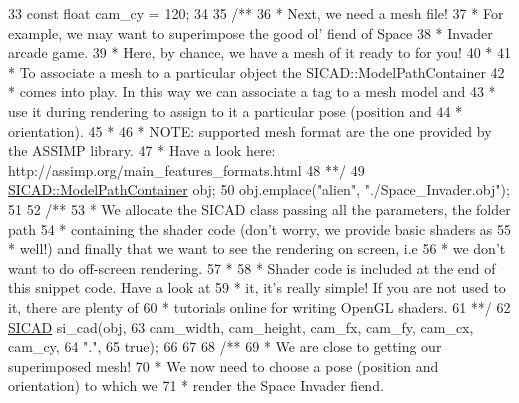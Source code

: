 \begin{DoxyCodeInclude}
33     \textcolor{keyword}{const} \textcolor{keywordtype}{float}        cam\_cy     = 120;
34 \textcolor{comment}{}
35 \textcolor{comment}{    /**}
36 \textcolor{comment}{     * Next, we need a mesh file!}
37 \textcolor{comment}{     * For example, we may want to superimpose the good ol' fiend of Space}
38 \textcolor{comment}{     * Invader arcade game.}
39 \textcolor{comment}{     * Here, by chance, we have a mesh of it ready to for you!}
40 \textcolor{comment}{     *}
41 \textcolor{comment}{     * To associate a mesh to a particular object the SICAD::ModelPathContainer}
42 \textcolor{comment}{     * comes into play. In this way we can associate a tag to a mesh model and}
43 \textcolor{comment}{     * use it during rendering to assign to it a particular pose (position and}
44 \textcolor{comment}{     * orientation).}
45 \textcolor{comment}{     *}
46 \textcolor{comment}{     * NOTE: supported mesh format are the one provided by the ASSIMP library.}
47 \textcolor{comment}{     *       Have a look here: http://assimp.org/main\_features\_formats.html}
48 \textcolor{comment}{     **/}
49     \mbox{\hyperlink{classSICAD_a9e1e1460d4c0f331b4fd015aae4dd721}{SICAD::ModelPathContainer}} obj;
50     obj.emplace(\textcolor{stringliteral}{"alien"}, \textcolor{stringliteral}{"./Space\_Invader.obj"});
51 \textcolor{comment}{}
52 \textcolor{comment}{    /**}
53 \textcolor{comment}{     * We allocate the SICAD class passing all the parameters, the folder path}
54 \textcolor{comment}{     * containing the shader code (don't worry, we provide basic shaders as}
55 \textcolor{comment}{     * well!) and finally that we want to see the rendering on screen, i.e}
56 \textcolor{comment}{     * we don't want to do off-screen rendering.}
57 \textcolor{comment}{     *}
58 \textcolor{comment}{     * Shader code is included at the end of this snippet code. Have a look at}
59 \textcolor{comment}{     * it, it's really simple! If you are not used to it, there are plenty of}
60 \textcolor{comment}{     * tutorials online for writing OpenGL shaders.}
61 \textcolor{comment}{     **/}
62     \mbox{\hyperlink{classSICAD}{SICAD}} si\_cad(obj,
63                  cam\_width, cam\_height, cam\_fx, cam\_fy, cam\_cx, cam\_cy,
64                  \textcolor{stringliteral}{"."},
65                  \textcolor{keyword}{true});
66 
67 \textcolor{comment}{}
68 \textcolor{comment}{    /**}
69 \textcolor{comment}{     * We are close to getting our superimposed mesh!}
70 \textcolor{comment}{     * We now need to choose a pose (position and orientation) to which we}
71 \textcolor{comment}{     * render the Space Invader fiend.}

\end{DoxyCodeInclude}

